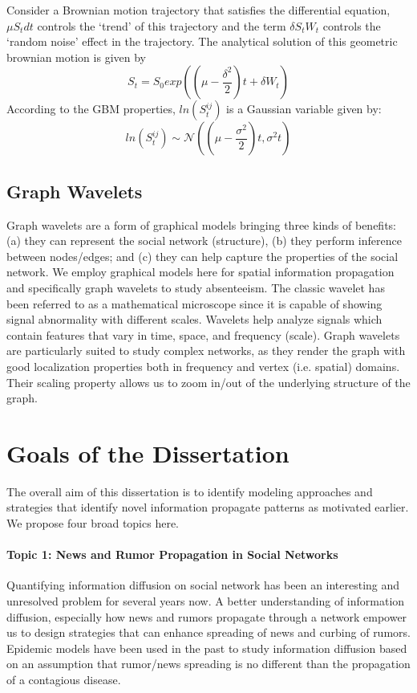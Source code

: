 Consider a Brownian motion trajectory that satisfies the differential equation, $\mu S_t dt$ controls the `trend' of this trajectory and the term $\delta S_t W_t$ controls the `random noise' effect in the trajectory. The analytical solution of this geometric brownian motion is given by $$S_t = S_0 exp((\mu-\frac{\delta^2}{2})t + \delta W_t) $$
According to the GBM properties, $ln(S_{t}^{ij})$ is a Gaussian variable given by:
$$ln(S_{t}^{ij})\sim \mathcal{N}((\mu - \frac{\sigma^2}{2})t, \sigma ^{2}t)$$


\subsection{Graph Wavelets}
Graph wavelets are a form of graphical models bringing 
three kinds of benefits: (a) they can
represent the social network (structure), (b) they
perform inference between nodes/edges; and (c) they can help
capture the properties of the social network. We employ graphical models here for spatial 
information propagation and specifically graph wavelets to study absenteeism.
The classic wavelet has been referred
to as a mathematical microscope since it is capable of showing signal abnormality with 
different scales. Wavelets help analyze signals which contain features that vary in time, space, and frequency (scale). Graph wavelets are particularly suited to study
complex networks, as they
render the graph with good localization properties both in frequency and vertex (i.e. spatial) 
domains. Their scaling property allows us to zoom in/out of the underlying structure of the graph.

\section{Goals of the Dissertation}
The overall aim of this dissertation is to identify modeling approaches and strategies that identify 
novel information propagate patterns as motivated earlier. We propose 
four broad topics here.

\paragraph{Topic 1: News and Rumor Propagation in Social Networks}

Quantifying information diffusion on social network has been an interesting and unresolved problem for several years now. A better understanding of information diffusion, especially how news and rumors propagate through a network empower us to design strategies that can enhance spreading of news and curbing of rumors. Epidemic models have been used in the past to study information diffusion based on an assumption that rumor/news spreading is no different than the propagation of a contagious disease.

